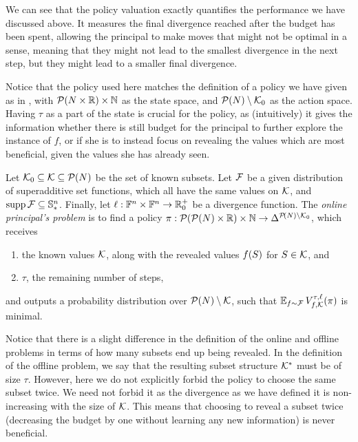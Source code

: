 We can see that the policy valuation exactly quantifies the performance we have discussed above.
It measures the final divergence reached after the budget has been spent, allowing the principal to make moves that might not be optimal in a  sense, meaning that they might not lead to the smallest divergence in the next step, but they might lead to a smaller final divergence.

Notice that the policy used here matches the definition of a policy we have given as  in , with $ \mathcal{P}\!\left(N \times \mathbb{R}\right) \times \mathbb{N} $ as the state space, and $ \mathcal{P}\!\left(N\right) \setminus \mathcal{K}_0 $ as the action space.
Having $ \tau $ as a part of the state is crucial for the policy, as (intuitively) it gives the information whether there is still budget for the principal to further explore the instance of $ f $, or if she is to instead focus on revealing the values which are most beneficial, given the values she has already seen.

\begin{defi} \label{def:online-pp}
  Let $ \mathcal{K}_0 \subseteq \mathcal{K} \subseteq \mathcal{P}\!\left(N\right) $ be the set of known subsets.
  Let $ \mathcal{F} $ be a given distribution of superadditive set functions, which all have the same values on $ \mathcal{K} $, and $ \operatorname{supp} \mathcal{F} \subseteq \mathbb{S}^n_* $.
  Finally, let $ \ell: \mathbb{F}^n \times \mathbb{F}^n \to \mathbb{R}^+_0 $ be a divergence function.
  The \emph{online principal's problem} is to find a policy $ \pi: \mathcal{P}\!\left(\mathcal{P}\!\left(N\right) \times \mathbb{R}\right) \times \mathbb{N} \to \Delta^{\mathcal{P}\!\left(N\right) \setminus \mathcal{K}_0} $,
  which receives \begin{enumerate}[ ]
    \item the known values $ \mathcal{K} $, along with the revealed values $ f\!\left(S\right) $ for $ S \in \mathcal{K} $, and
    \item $ \tau $, the remaining number of steps,
  \end{enumerate}
  and outputs a probability distribution over $ \mathcal{P}\!\left(N\right) \setminus \mathcal{K} $, such that $ \operatorname*{\mathbb{E}}_{f \sim \mathcal{F}} V^{\tau,\ell}_{f,\mathcal{K}}\!\left(\pi\right) $ is minimal.
\end{defi}

Notice that there is a slight difference in the definition of the online and offline problems in terms of how many subsets end up being revealed.
In the definition of the offline problem, we say that the resulting subset structure $ \mathcal{K}^* $ must be of size $ \tau $.
However, here we do not explicitly forbid the policy to choose the same subset twice.
We need not forbid it as the divergence as we have defined it is non-increasing with the size of $ \mathcal{K} $.
This means that choosing to reveal a subset twice (decreasing the budget by one without learning any new information) is never beneficial.

